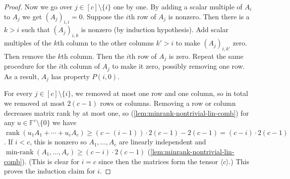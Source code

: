 \documentclass{daj}
\newcommand{\FF}{\mathbb{F}}
\DeclareMathOperator{\rank}{rank} \DeclareMathOperator{\col}{colspan}
\DeclareMathOperator{\minrank}{min-rank}
\begin{document}
\begin{proof}
Now we go over $j \in [c] \setminus \{i\}$ one by one. By adding a scalar multiple of $A_i$ to $A_j$ we get $(A_j)_{i,i} = 0$. Suppose the $i$th row of $A_j$ is nonzero. Then there is a $k>i$ such that $(A_j)_{i,k}$ is nonzero (by induction hypothesis). Add scalar multiples of the $k$th column to the other columns $k'>i$ to make $(A_j)_{i,k'}$ zero. Then remove the $k$th column. Then the $i$th row of $A_j$ is zero. Repeat the same procedure for the $i$th column of $A_j$ to make it zero, possibly removing one row. As a result, $A_j$ has property $P(i,0)$.

For every $j \in [c] \setminus \{i\}$, we removed at most one row and one column, so in total we removed at most $2(c-1)$ rows or columns. Removing a row or column decreases matrix rank by at most one, so (\autoref{lem:minrank-nontrivial-lin-comb})
for any $u\in\FF^{c}\setminus\{0\}$ we have $\rank(u_1A_1+\cdots+u_cA_c)\geq
(c-(i-1))\cdot 2(c-1) - 2(c-1) = (c-i)\cdot 2(c-1)$. 
If $i < c$, this is nonzero so $A_1, \ldots, A_c$ are linearly independent and $\minrank(A_1,\ldots,A_c) \geq (c-i)\cdot 2(c-1)$ (\autoref{lem:minrank-nontrivial-lin-comb}). (This is clear for $i=c$ since then the matrices form the tensor $\langle c\rangle$.) %
This proves the induction claim for $i$.
\end{proof}

\end{document}
